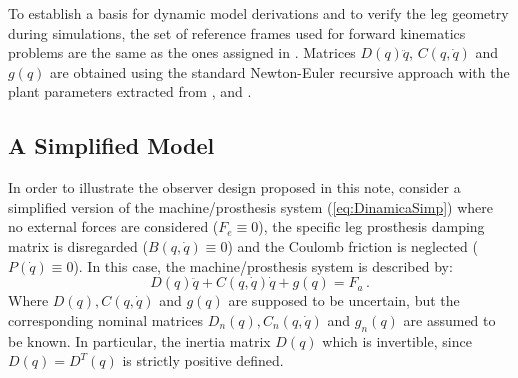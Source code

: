 \documentclass[letterpaper, 10 pt, conference]{ieeeconf}  %
\theoremstyle{plain}
\theoremstyle{definition}
\theoremstyle{remark}
\begin{document}
To establish a basis for dynamic model derivations and to verify the leg geometry during simulations, the set of reference frames used for forward kinematics problems are the same as the ones assigned in \cite{Richter2015}. Matrices $D(q)\ddot{q}$, $C(q,\dot{q})$ and $g(q)$ are obtained using the standard Newton-Euler recursive approach with the plant parameters extracted from \cite{Richter2015}, \cite{Fakoorian2016} and \cite{Warner2015}.

\subsection{A Simplified Model}


In order to illustrate the observer design proposed in this note, consider a simplified version of the machine/prosthesis system (\ref{eq:DinamicaSimp}) where no external forces are considered ($F_e \equiv 0$), the specific leg prosthesis damping matrix is disregarded ($B(q,\dot{q}) \equiv 0$) and the  Coulomb friction is neglected  ($P(\dot{q}) \equiv 0$). In this case, the machine/prosthesis system is described by:
%
\begin{equation}
D(q)\ddot{q} + C(q,\dot{q})\dot{q}+g(q) = F_a\,.
\label{eq:DinamicaSimp}
\end{equation}
%
Where $D(q), C(q,\dot{q})$ and $g(q)$ are supposed to be uncertain, but the corresponding nominal matrices  $D_n(q), C_n(q,\dot{q})$ and $g_n(q)$ are assumed to be known. In particular, the inertia matrix $D(q)$ which is invertible, since $D(q)=D^T(q)$ is strictly positive defined.
\end{document}
